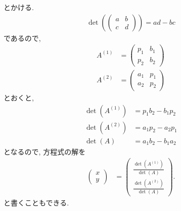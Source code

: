 とかける.
\begin{align*}
  \det(\begin{pmatrix}a&b\\c&d\end{pmatrix})=ad-bc
\end{align*}
であるので,
\begin{align*}
  A^{(1)}&=\begin{pmatrix}p_1&b_1\\p_2&b_2\end{pmatrix}\\
  A^{(2)}&=\begin{pmatrix}a_1&p_1\\a_2&p_2\end{pmatrix}
\end{align*}
とおくと,
\begin{align*}
  \det(A^{(1)})&=p_1b_2-b_1p_2\\
  \det(A^{(2)})&=a_1p_2-a_2p_1\\
  \det(A)&=a_1b_2-b_1a_2
\end{align*}
となるので, 方程式の解を
\begin{align*}
  \begin{pmatrix}x\\y\end{pmatrix}
    &=
  \begin{pmatrix}\frac{\det(A^{(1)})}{\det(A)}\\\frac{\det(A^{(2)})}{\det(A)}\end{pmatrix}.
\end{align*}
と書くこともできる.

